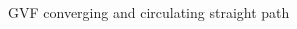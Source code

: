 \documentclass[conf]{new-aiaa}
\begin{document}
\begin{figure}[H]
	\begin{subfigmatrix}{2}%
		\centering	
		\hspace*{0mm}
	\end{subfigmatrix}
	\caption{GVF converging and circulating straight path}
	\label{fig:GVFLine}
\end{figure} 
\end{document}
